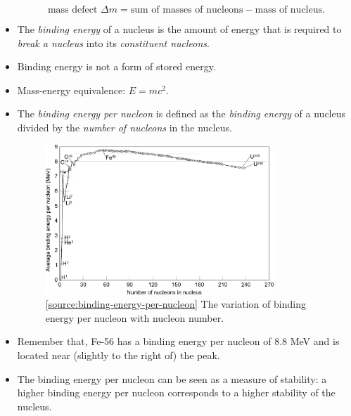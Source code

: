 \documentclass[oneside]{book}
\begin{document}
\begin{itemize}
    \[\text{mass defect }\Delta m=\text{sum of masses of nucleons}-\text{mass of nucleus}.\]
    \item[\AsteriskThin] The \emph{binding energy} of a nucleus is the amount of energy that is required to \emph{break a nucleus} into its \emph{constituent nucleons}.
    \item Binding energy is not a form of stored energy. 
    \item Mass-energy equivalence: \(E=mc^2\).
    \item[\AsteriskThin] The \emph{binding energy per nucleon} is defined as the \emph{binding energy} of a nucleus divided by the \emph{number of nucleons} in the nucleus.
    \begin{figure}[H]
        \centering
        \includegraphics[width=0.81\textwidth]{../images/Binding energy per nucleon.pdf}
        \caption{\ref{source:binding-energy-per-nucleon} The variation of binding energy per nucleon with nucleon number.}
        \label{fig:binding-energy-per-nucleon}
    \end{figure}
    \item Remember that, Fe-56 has a binding energy per nucleon of 8.8 MeV and is located near (slightly to the right of) the peak.
    \item The binding energy per nucleon can be seen as a measure of stability: a higher binding energy per nucleon corresponds to a higher stability of the nucleus.
\end{itemize}
\end{document}

